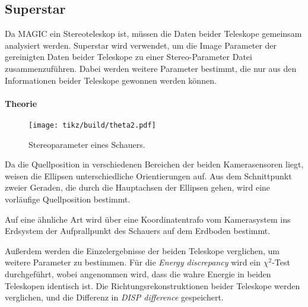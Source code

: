 \subsection{Superstar}%
\label{sub:superstar}

Da MAGIC ein Stereoteleskop ist,
müssen die Daten beider Teleskope gemeinsam analysiert werden.
Superstar wird verwendet,
um die Image Parameter der gereinigten Daten beider
Teleskope zu einer Stereo-Parameter Datei zusammenzuführen.
Dabei werden weitere Parameter bestimmt,
die nur aus den Informationen beider Teleskope gewonnen werden können.

\paragraph{Theorie}%

\begin{wrapfigure}[14]{O}{0.4\textwidth}
  \centering
  \texttt{[image: tikz/build/theta2.pdf]}
  \caption{Stereoparameter eines Schauers.}%
  \label{fig:reco}
\end{wrapfigure}

Da die Quellposition in verschiedenen Bereichen der beiden Kamerasensoren
liegt,
weisen die Ellipsen unterschiedliche Orientierungen auf.
Aus dem Schnittpunkt zweier Geraden,
die durch die Hauptachsen der Ellipsen gehen,
wird eine vorläufige Quellposition bestimmt.

Auf eine ähnliche Art wird über eine Koordinatentrafo vom Kamerasystem ins
Erdsystem der Aufprallpunkt des Schauers auf dem Erdboden
bestimmt.


Außerdem werden die Einzelergebnisse der beiden Teleskope verglichen,
um weitere Parameter zu bestimmen.
Für die \textit{Energy discrepancy} wird
ein $\chi^2$-Test durchgeführt,
wobei angenommen wird,
dass die wahre Energie in beiden Teleskopen identisch ist.
Die Richtungsrekonstruktionen beider Teleskope werden verglichen,
und die Differenz in \textit{DISP difference} gespeichert.
